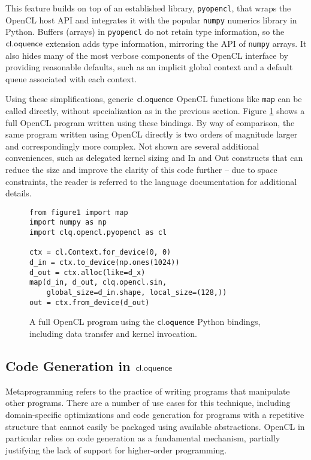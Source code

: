 \documentclass{llncs}
\begin{document}
This feature builds on top of an established library, \verb|pyopencl|, that wraps the OpenCL host API and integrates it with the popular \verb|numpy| numerics library in Python. Buffers (arrays) in \verb|pyopencl| do not retain type information, so the $\textsf{cl.oquence}$ extension adds type information, mirroring the API of \verb|numpy| arrays. It also hides many of the most verbose components of the OpenCL interface by providing reasonable defaults, such as an implicit global context and a default queue associated with each context. 

Using these simplifications, generic $\textsf{cl.oquence}$ OpenCL functions like \verb|map| can be called directly, without specialization as in the previous section. Figure \ref{py} shows a full OpenCL program written using these bindings. By way of comparison, the same program written using OpenCL directly is two orders of magnitude larger and correspondingly more complex. Not shown are several additional conveniences, such as delegated kernel sizing and In and Out constructs that can reduce the size and improve the clarity of this code further -- due to space constraints, the reader is referred to the language documentation for additional details.

\begin{figure}
\small{\begin{verbatim}
from figure1 import map
import numpy as np
import clq.opencl.pyopencl as cl

ctx = cl.Context.for_device(0, 0)
d_in = ctx.to_device(np.ones(1024))
d_out = ctx.alloc(like=d_x)
map(d_in, d_out, clq.opencl.sin, 
    global_size=d_in.shape, local_size=(128,))
out = ctx.from_device(d_out)
\end{verbatim}}
\caption{A full OpenCL program using the $\textsf{cl.oquence}$ Python bindings, including data transfer and kernel invocation.}
\label{py}
\end{figure}

\subsection{Code Generation in $\textsf{cl.oquence}$}
Metaprogramming refers to the practice of writing programs that manipulate other programs. There are a number of use cases for this technique, including domain-specific optimizations and code generation for programs with a repetitive structure that cannot easily be packaged using available abstractions. OpenCL in particular relies on code generation as a fundamental mechanism, partially justifying the lack of support for higher-order programming.
\end{document}
